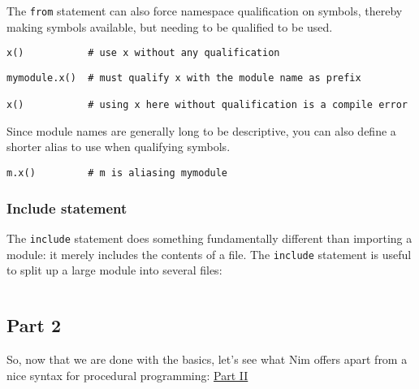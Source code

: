 \begin{verbatim}
\end{verbatim}

The \texttt{from} statement can also force namespace qualification on
symbols, thereby making symbols available, but needing to be qualified
to be used.

\begin{verbatim}
x()           # use x without any qualification
\end{verbatim}

\begin{verbatim}
mymodule.x()  # must qualify x with the module name as prefix

x()           # using x here without qualification is a compile error
\end{verbatim}

Since module names are generally long to be descriptive, you can also
define a shorter alias to use when qualifying symbols.

\begin{verbatim}
m.x()         # m is aliasing mymodule
\end{verbatim}

\hypertarget{include-statement}{%
\subsubsection{Include statement}\label{include-statement}}

The \texttt{include} statement does something fundamentally different
than importing a module: it merely includes the contents of a file. The
\texttt{include} statement is useful to split up a large module into
several files:

\begin{verbatim}
\end{verbatim}

\hypertarget{part-2}{%
\subsection{Part 2}\label{part-2}}

So, now that we are done with the basics, let's see what Nim offers
apart from a nice syntax for procedural programming:
\href{tut2.html}{Part II}
